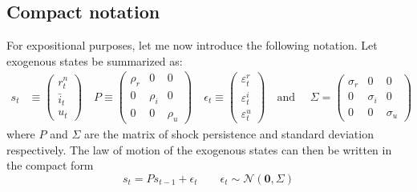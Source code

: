 \documentclass[11pt]{article}
\renewcommand{\[}{\begin{equation}}
\renewcommand{\]}{\end{equation}}
\begin{document}
 \subsection{Compact notation}
 For expositional purposes, let me now introduce the following notation. Let exogenous states be summarized as:
 \begin{align}
 s_t & \equiv \begin{pmatrix} r_t^n \\ \bar{i}_t \\ u_t 
 \end{pmatrix} \quad 
 P  \equiv \begin{pmatrix} \rho_r & 0 & 0 \\ 0& \rho_i & 0 \\ 0&0& \rho_u 
 \end{pmatrix}  \quad 
 \epsilon_t \equiv \begin{pmatrix}\varepsilon_t^{r} \\ \varepsilon_t^{i}  \\ \varepsilon_t^{u} 
 \end{pmatrix}  \quad  \text{and } \quad \Sigma  =  \begin{pmatrix} \sigma_r & 0 & 0 \\ 0& \sigma_i & 0 \\ 0&0& \sigma_u 
 \end{pmatrix} 
 \end{align}
 where $P$ and $\Sigma$ are the matrix of shock persistence and standard deviation respectively. The law of motion of the exogenous states can then be written in the compact form
 \begin{equation}
 s_t  = P s_{t-1} + \epsilon_t  \quad \quad \epsilon_t \sim \mathcal{N}(\mathbf{0}, \Sigma)
 \end{equation}
\end{document}
